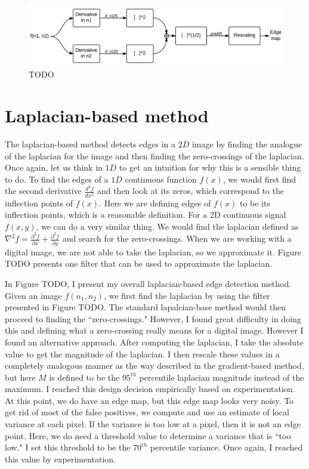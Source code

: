 \documentclass[12pt]{amsart}
\begin{document}
\begin{figure}
\centering
\includegraphics[width=\linewidth]{GradientMethod.png}
\caption{TODO}
\label{fig:TODO}
\end{figure}

\section{Laplacian-based method}

The laplacian-based method detects edges in a $2D$ image by finding the analogue of the laplacian for the image and then finding the zero-crossings of the laplacian. Once again, let us think in $1D$ to get an intuition for why this is a sensible thing to do. To find the edges of a $1D$ continuous function $f(x)$, we would first find the second derivative $\frac{d^2f}{dx^2}$ and then look at its zeros, which correspond to the inflection points of $f(x)$. Here we are defining edges of $f(x)$ to be its inflection points, which is a reasonable definition. For a 2D continuous signal $f(x,y)$, we can do a very similar thing. We would find the laplacian defined as $\nabla^2f = \frac{\partial^2f}{\partial x} +  \frac{\partial^2f}{\partial y}$ and search for the zero-crossings. When we are working with a digital image, we are not able to take the laplacian, so we approximate it. Figure TODO presents one filter that can be used to approximate the laplacian.

In Figure  TODO, I present my overall laplacian-based edge detection method. Given an image $f(n_1, n_2)$, we first find the laplacian by using the filter presented in Figure TODO. The standard lapalcian-base method would then proceed to finding the ``zero-crossings." However, I found great difficulty in doing this and defining what a zero-crossing really means for a digital image. However I found an alternative approach. After computing the laplacian, I take the absolute value to get the magnitude of the laplacian. I then rescale these values in a completely analogous manner as the way described in the gradient-based method, but here $M$ is defined to be the $95^{th}$ percentile laplacian magnitude instead of the maximum. I reached this design decision empirically based on experimentation. At this point, we do have an edge map, but this edge map looks very noisy. To get rid of most of the false positives, we compute and use an estimate of local variance at each pixel. If the variance is too low at a pixel, then it is not an edge point. Here, we do need a threshold value to determine a variance that is ``too low." I set this threshold to be the $70^{th}$ percentile variance. Once again, I reached this value by experimentation.
\end{document}
